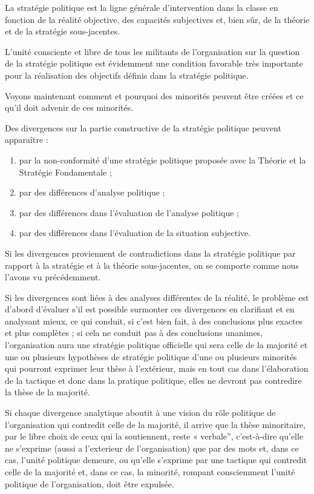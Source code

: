 La stratégie politique est la ligne générale d'intervention dans la classe en fonction de la réalité objective, des capacités subjectives et, bien sûr, de la théorie et de la stratégie sous-jacentes.

L'unité consciente et libre de tous les militants de l'organisation sur la question de la stratégie politique est évidemment une condition favorable très importante pour la réalisation des objectifs définis dans la stratégie politique.

Voyons maintenant comment et pourquoi des minorités peuvent être créées et ce qu'il doit advenir de ces minorités.

Des divergences sur la partie constructive de la stratégie politique peuvent apparaître :

\begin{enumerate}
\item{} par la non-conformité d'une stratégie politique proposée avec la Théorie et la Stratégie Fondamentale ;
\item{} par des différences d'analyse politique ;
\item{} par des différences dans l'évaluation de l'analyse politique ;
\item{} par des différences dans l'évaluation de la situation subjective.
\end{enumerate}

Si les divergences proviennent de contradictions dans la stratégie politique par rapport à la stratégie et à la théorie sous-jacentes, on se comporte comme nous l'avons vu précédemment.

Si les divergences sont liées à des analyses différentes de la réalité, le problème est d'abord d'évaluer s'il est possible surmonter ces divergences en clarifiant et en analysant mieux, ce qui conduit, si c'est bien fait, à des conclusions plus exactes et plus complètes ; si cela ne conduit pas à des conclusions unanimes, l'organisation aura une stratégie politique officielle qui sera celle de la majorité et une ou plusieurs hypothèses de stratégie politique d'une ou plusieurs minorités qui pourront exprimer leur thèse à l'extérieur, mais en tout cas dans l'élaboration de la tactique et donc dans la pratique politique, elles ne devront pas contredire la thèse de la majorité.

Si chaque divergence analytique aboutit à une vision du rôle politique de l'organisation qui contredit celle de la majorité, il arrive que la thèse minoritaire, par le libre choix de ceux qui la soutiennent, reste « verbale'', c'est-à-dire qu'elle ne s'exprime (aussi a l’exterieur de l’organisation) que par des mots et, dans ce cas, l'unité politique demeure, ou qu'elle s'exprime par une tactique qui contredit celle de la majorité et, dans ce cas, la minorité, rompant consciemment l'unité politique de l'organisation, doit être expulsée.

